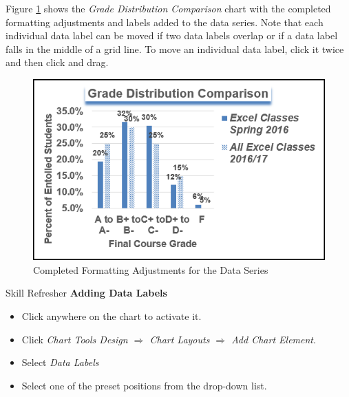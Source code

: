 Figure \ref{04:fig39} shows the \textit{Grade Distribution Comparison} chart with the completed formatting adjustments and labels added to the data series. Note that each individual data label can be moved if two data labels overlap or if a data label falls in the middle of a grid line. To move an individual data label, click it twice and then click and drag.

\begin{figure}[H]
	\centering
	\includegraphics[width=\maxwidth{.95\linewidth}]{gfx/ch04_fig39}
	\caption{Completed Formatting Adjustments for the Data Series}
	\label{04:fig39}
\end{figure}

\begin{center}
	\begin{sklbox}{Skill Refresher}
		\textbf{Adding Data Labels}
		\\
		\begin{itemize}
			\setlength{\itemsep}{0pt}
			\setlength{\parskip}{0pt}
			\setlength{\parsep}{0pt}

			\item Click anywhere on the chart to activate it.
			\item Click \textit{Chart Tools Design $ \Rightarrow $ Chart Layouts $ \Rightarrow $ Add Chart Element}.
			\item Select \textit{Data Labels}
			\item Select one of the preset positions from the drop-down list.
			
		\end{itemize}
	\end{sklbox}
\end{center}

